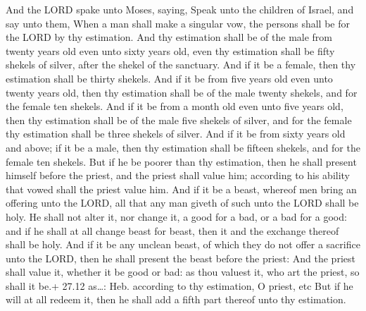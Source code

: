 And the LORD spake unto Moses, saying,  Speak
unto the children of Israel, and say unto them, When a man shall make a
singular vow, the persons shall be for the LORD by thy estimation.
 And thy estimation shall be of the male from twenty years
old even unto sixty years old, even thy estimation shall be fifty
shekels of silver, after the shekel of the sanctuary.  And
if it be a female, then thy estimation shall be thirty shekels.
 And if it be from five years old even unto twenty years
old, then thy estimation shall be of the male twenty shekels, and for
the female ten shekels.  And if it be from a month old even
unto five years old, then thy estimation shall be of the male five
shekels of silver, and for the female thy estimation shall be three
shekels of silver.  And if it be from sixty years old and
above; if it be a male, then thy estimation shall be fifteen shekels,
and for the female ten shekels.  But if he be poorer than
thy estimation, then he shall present himself before the priest, and the
priest shall value him; according to his ability that vowed shall the
priest value him.  And if it be a beast, whereof men bring
an offering unto the LORD, all that any man giveth of such unto the LORD
shall be holy.  He shall not alter it, nor change it, a
good for a bad, or a bad for a good: and if he shall at all change beast
for beast, then it and the exchange thereof shall be holy. 
And if it be any unclean beast, of which they do not offer a sacrifice
unto the LORD, then he shall present the beast before the priest:
 And the priest shall value it, whether it be good or bad:
as thou valuest it, who art the priest, so shall it be.+ 27.12 as\ldots:
Heb. according to thy estimation, O priest, etc  But if he
will at all redeem it, then he shall add a fifth part thereof unto thy
estimation.

